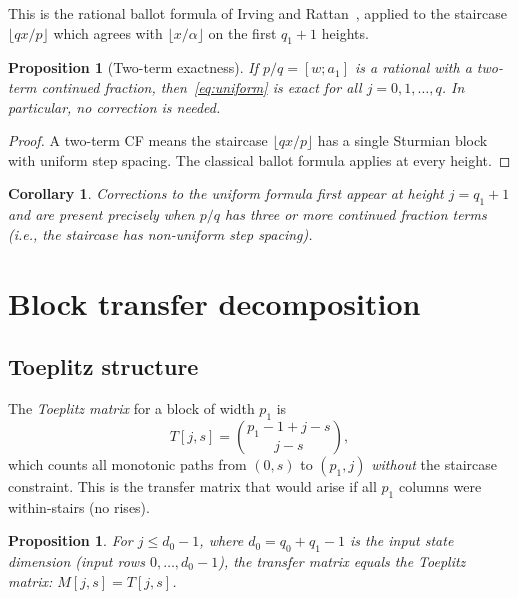 \documentclass[11pt]{article}
\newtheorem{corollary}[theorem]{Corollary}
\newtheorem{proposition}[theorem]{Proposition}
\theoremstyle{definition}
\theoremstyle{remark}
\newcommand{\floor}[1]{\lfloor #1 \rfloor}
\begin{document}
This is the rational ballot formula of Irving and
Rattan~\cite{IrvingRattan2009}, applied to the staircase
$\floor{qx/p}$ which agrees with $\floor{x/\alpha}$ on the first
$q_1 + 1$ heights.

\begin{proposition}[Two-term exactness]\label{prop:twoterm}
If $p/q = [w; a_1]$ is a rational with a two-term continued
fraction, then~\eqref{eq:uniform} is exact for \emph{all}
$j = 0, 1, \ldots, q$.
In particular, no correction is needed.
\end{proposition}

\begin{proof}
A two-term CF means the staircase $\floor{qx/p}$ has a single
Sturmian block with uniform step spacing.
The classical ballot formula applies at every height.
\end{proof}

\begin{corollary}\label{cor:correction-start}
Corrections to the uniform formula first appear at height
$j = q_1 + 1$ and are present precisely when $p/q$ has three or
more continued fraction terms (i.e., the staircase has non-uniform
step spacing).
\end{corollary}

\section{Block transfer decomposition}\label{sec:transfer}

\subsection{Toeplitz structure}

The \emph{Toeplitz matrix} for a block of width $p_1$ is
\begin{equation}\label{eq:toeplitz}
  T[j, s] = \binom{p_1 - 1 + j - s}{j - s},
\end{equation}
which counts all monotonic paths from $(0, s)$ to $(p_1, j)$
\emph{without} the staircase constraint.
This is the transfer matrix that would arise if all $p_1$ columns
were within-stairs (no rises).

\begin{proposition}\label{prop:toeplitz-exact}
For $j \leq d_0 - 1$, where $d_0 = q_0 + q_1 - 1$ is the input
state dimension (input rows $0, \ldots, d_0 - 1$), the transfer
matrix equals the Toeplitz matrix:
$M[j, s] = T[j, s]$.
\end{proposition}
\end{document}
